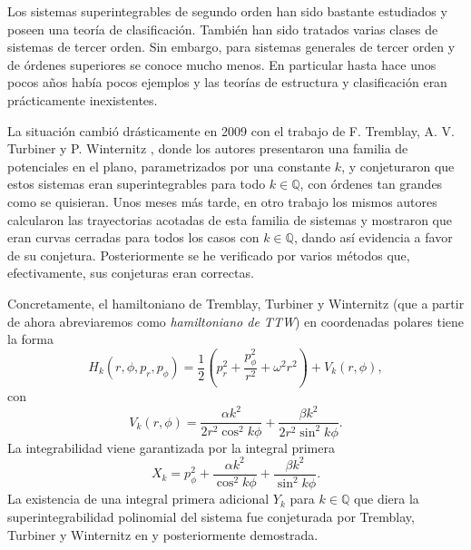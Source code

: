 \documentclass[12pt,a4paper,twoside]{article}
\theoremstyle{definition} \newtheorem{defn}[thm]{Definición}
\theoremstyle{definition} \newtheorem{ejemplo}[thm]{Ejemplo}
\theoremstyle{definition} \newtheorem{ejercicio}[thm]{Ejercicio}
\theoremstyle{remark} \newtheorem*{obs}{Observación}
\def\QQ{\mathbb{Q}}
\begin{document}
Los sistemas superintegrables de segundo orden han sido bastante estudiados y poseen una teoría de clasificación. También han sido tratados varias clases de sistemas de tercer orden. Sin embargo, para sistemas generales de tercer orden y de órdenes superiores se conoce mucho menos. En particular hasta hace unos pocos años había pocos ejemplos y las teorías de estructura y clasificación eran prácticamente inexistentes. 

La situación cambió drásticamente en 2009 con el trabajo de F. Tremblay, A. V. Turbiner y P. Winternitz \cite{ttw1}, donde los autores presentaron una familia de potenciales en el plano, parametrizados por una constante $k$, y conjeturaron que estos sistemas eran superintegrables para todo $k\in \QQ$, con órdenes tan grandes como se quisieran. Unos meses más tarde, en otro trabajo \cite{ttw2} los mismos autores calcularon las trayectorias acotadas de esta familia de sistemas y mostraron que eran curvas cerradas para todos los casos con $k \in \QQ$, dando así evidencia a favor de su conjetura. Posteriormente se he verificado por varios métodos que, efectivamente, sus conjeturas eran correctas.

Concretamente, el hamiltoniano de Tremblay, Turbiner y Winternitz (que a partir de ahora abreviaremos como \emph{hamiltoniano de TTW}) en coordenadas polares tiene la forma 
\begin{equation}
  H_k(r,\phi,p_r,p_{\phi})=\frac{1}{2}\left( p_r^2+\frac{p^2_{\phi}}{r^2} +\omega^2 r^2 \right) + V_k(r,\phi),
\end{equation}
con
\begin{equation}
  V_k(r,\phi)=\frac{\alpha k^2}{2r^2\cos^2 k\phi}+\frac{\beta k^2}{2r^2\sin^2 k\phi}.
  \label{eq:TTW}
\end{equation}
La integrabilidad viene garantizada por la integral primera
\begin{equation}
  X_k=p_{\phi}^2+\frac{\alpha k^2}{\cos^2 k\phi}+\frac{\beta k^2}{\sin^2 k\phi}.
  \label{eq:integralprimeraTTW}
\end{equation}
La existencia de una integral primera adicional $Y_{k}$ para $k\in \QQ$ que diera la superintegrabilidad polinomial del sistema fue conjeturada por Tremblay, Turbiner y Winternitz en \cite{ttw1} y posteriormente demostrada.
\end{document}
